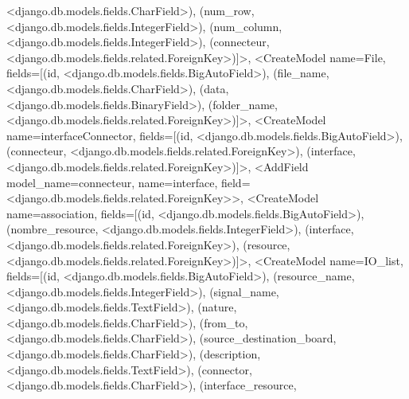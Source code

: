 \documentclass[letterpaper,10pt,english]{sphinxmanual}
\begin{document}
\begin{fulllineitems}
\begin{fulllineitems}
\textless{}django.db.models.fields.CharField\textgreater{}), (\textquotesingle{}num\_row\textquotesingle{}, \textless{}django.db.models.fields.IntegerField\textgreater{}), (\textquotesingle{}num\_column\textquotesingle{}, \textless{}django.db.models.fields.IntegerField\textgreater{}), (\textquotesingle{}connecteur\textquotesingle{}, \textless{}django.db.models.fields.related.ForeignKey\textgreater{}){]}\textgreater{}, \textless{}CreateModel  name=\textquotesingle{}File\textquotesingle{}, fields={[}(\textquotesingle{}id\textquotesingle{}, \textless{}django.db.models.fields.BigAutoField\textgreater{}), (\textquotesingle{}file\_name\textquotesingle{}, \textless{}django.db.models.fields.CharField\textgreater{}), (\textquotesingle{}data\textquotesingle{}, \textless{}django.db.models.fields.BinaryField\textgreater{}), (\textquotesingle{}folder\_name\textquotesingle{}, \textless{}django.db.models.fields.related.ForeignKey\textgreater{}){]}\textgreater{}, \textless{}CreateModel  name=\textquotesingle{}interfaceConnector\textquotesingle{}, fields={[}(\textquotesingle{}id\textquotesingle{}, \textless{}django.db.models.fields.BigAutoField\textgreater{}), (\textquotesingle{}connecteur\textquotesingle{}, \textless{}django.db.models.fields.related.ForeignKey\textgreater{}), (\textquotesingle{}interface\textquotesingle{}, \textless{}django.db.models.fields.related.ForeignKey\textgreater{}){]}\textgreater{}, \textless{}AddField  model\_name=\textquotesingle{}connecteur\textquotesingle{}, name=\textquotesingle{}interface\textquotesingle{}, field=\textless{}django.db.models.fields.related.ForeignKey\textgreater{}\textgreater{}, \textless{}CreateModel  name=\textquotesingle{}association\textquotesingle{}, fields={[}(\textquotesingle{}id\textquotesingle{}, \textless{}django.db.models.fields.BigAutoField\textgreater{}), (\textquotesingle{}nombre\_resource\textquotesingle{}, \textless{}django.db.models.fields.IntegerField\textgreater{}), (\textquotesingle{}interface\textquotesingle{}, \textless{}django.db.models.fields.related.ForeignKey\textgreater{}), (\textquotesingle{}resource\textquotesingle{}, \textless{}django.db.models.fields.related.ForeignKey\textgreater{}){]}\textgreater{}, \textless{}CreateModel  name=\textquotesingle{}IO\_list\textquotesingle{}, fields={[}(\textquotesingle{}id\textquotesingle{}, \textless{}django.db.models.fields.BigAutoField\textgreater{}), (\textquotesingle{}resource\_name\textquotesingle{}, \textless{}django.db.models.fields.IntegerField\textgreater{}), (\textquotesingle{}signal\_name\textquotesingle{}, \textless{}django.db.models.fields.TextField\textgreater{}), (\textquotesingle{}nature\textquotesingle{}, \textless{}django.db.models.fields.CharField\textgreater{}), (\textquotesingle{}from\_to\textquotesingle{}, \textless{}django.db.models.fields.CharField\textgreater{}), (\textquotesingle{}source\_destination\_board\textquotesingle{}, \textless{}django.db.models.fields.CharField\textgreater{}), (\textquotesingle{}description\textquotesingle{}, \textless{}django.db.models.fields.TextField\textgreater{}), (\textquotesingle{}connector\textquotesingle{}, \textless{}django.db.models.fields.CharField\textgreater{}), (\textquotesingle{}interface\_resource\textquotesingle{}, 
\end{fulllineitems}
\end{fulllineitems}
\end{document}
